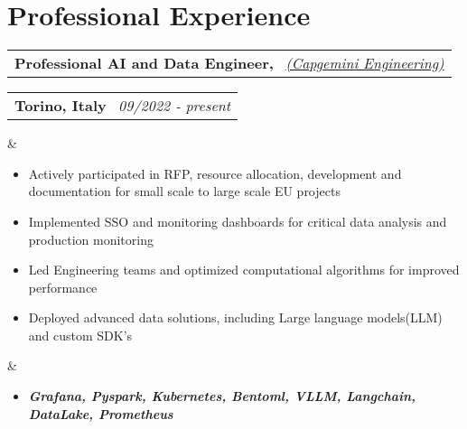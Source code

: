 \documentclass[10pt,a4paper,sans]{moderncv}
\makeatletter
\newcommand*{\customcventry}[7][.10em]{
	\begin{tabular}{@{}l}
		{\bfseries #4} \
		{\itshape #3}
	\end{tabular}
	\hfill
	\begin{tabular}{l@{}}
		{\bfseries #5} \
		{\itshape #2}
	\end{tabular}
	\ifx&#7&%
	\else{\
		\begin{minipage}{\maincolumnwidth}%
			\small#7%
	\end{minipage}}\fi%
	\par\addvspace{#1}}
\makeatother
\begin{document}
	\section{Professional Experience}
	\customcventry{09/2022 ‐ present}{{\color{blue}\href{https://www.capgemini.com/it-it/chi-siamo/scopri-capgemini/i-nostri-brand/capgemini-engineering/}{(Capgemini Engineering)}}}{Professional AI and Data Engineer,}{Torino, Italy}{}{
		{\begin{itemize}[leftmargin=0.6cm, label={\textbullet}]
				\itemsep0em 
				\item Actively participated in RFP, resource allocation, development and documentation for small scale to large scale EU projects 
                    \item Implemented SSO and monitoring dashboards for critical data analysis and production monitoring
                    \item Led Engineering teams and optimized computational algorithms for improved performance
                    \item Deployed advanced data solutions, including Large language models(LLM) and custom SDK's
	\end{itemize}}}
	\begin{itemize}
		\item[]\small\textbf{\emph{Grafana, Pyspark, Kubernetes, Bentoml, VLLM, Langchain, DataLake, Prometheus}}
	\end{itemize}
\begin{comment}
- ENI
	- Recovered data from archived pdf using textract
	- Displayed them in the webapp
	AWS Textract, flask, jinja
- Saipem 
	- Integerated Keyclock with the grafana for SSO Authentication
	- Created grafana dashabords to view critical data to monitor production line on ships
	- Handled a team of 4 engineers with varying level of seniority to effectively complete the project
	Postgres, grafana
- ESA
	- Created a platform for engineers to user various tools like dask, spark and zeppeline
	- Deployed the platform using kubernetes
	Kubernetes
- Terna
	- Created ETL pipeline from sych data to the warehouse
	- Created dashboards and provisions to view logs of the ETL in a webapp
	Django, Postgres, DynamoDB, SQlachemy, jinja, AWSEC2
- ENEL
	- Actively worked with Engineers to parallelise the algorithm with muliprocessing/threading
	Python
- AIDA
	- Deployed LLM to serve request using bentoml
	- Created chatbot with RAG to answer queries about technical specification of different housing appliances
	Bentoml, Langchain, LLM, VLLM
- Hitachi Rail
	- Created SDK to get data from minio and trino
\end{comment}
\end{document}
